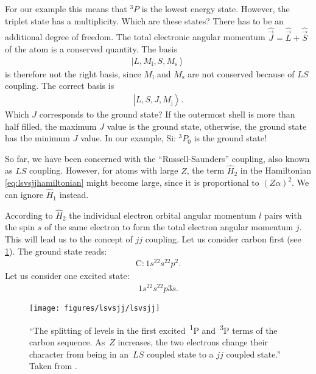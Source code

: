 \documentclass[10pt]{article}
\let\cite\citep
\providecommand\citep{\cite}
\newcommand{\ket}[1]{\ensuremath{\left|#1\right\rangle}}
\newcommand*\ch[1]{\ensuremath{\mathrm{#1}}}
\begin{document}
For our example this means that $^3P$ is the lowest energy state. However, the triplet state has a multiplicity.  Which are these states? There has to be an additional degree of freedom. The total electronic angular momentum $\hat{\vec{J}} = \hat{\vec{L}} + \hat{\vec{S}}$ of the atom is a conserved quantity. The basis
\begin{align}
\ket{L,M_\textrm{l},S,M_\textrm{s}}
\end{align}
is therefore not the right basis, since $M_\textrm{l}$ and $M_\textrm{s}$ are not conserved because of $LS$ coupling. The correct basis is
\begin{align}
\ket{L,S,J,M_\textrm{j}}.
\end{align}
Which $J$ corresponds to the ground state?
 If the outermost shell is more than half filled, the maximum $J$ value is the ground state, otherwise, the ground state has the minimum $J$ value. In our example, \ch{Si}: $^3P_0$ is the ground state!


So far, we have been concerned with the ``Russell-Saunders'' coupling, also known as $LS$ coupling. However, for atoms with large $Z$, the term $\hat{H}_2$ in the Hamiltonian \eqref{eq:lsvsjjhamiltonian}
might become large, since it is proportional to $(Z \alpha)^2$. We can ignore $\hat{H}_1$ instead.

According to $\hat{H}_2$ the individual electron orbital angular momentum $l$ pairs with the spin $s$ of the same electron to form the total electron angular momentum $j$. This will lead us to the concept of $jj$ coupling. Let us consider carbon first (see \ref{693186}). The ground state reads:
\begin{align}
\ch{C}: 1s^22s^22p^2.
\end{align}
Let us consider one excited state:
\begin{align}
1s^22s^22p3s.
\end{align}
\begin{figure}[h!]
\begin{center}
\texttt{[image: figures/lsvsjj/lsvsjj]}
\caption{{``The splitting of levels in the first excited~\textsuperscript{1}P
and~\textsuperscript{3}P terms of the carbon sequence.
As~\(Z\) increases, the two electrons change their
character from being in an~\(LS\) coupled state to a
\(jj\) coupled state.'' Taken from \protect\cite{pearson}.
{\label{693186}}%
}}
\end{center}
\end{figure}
\end{document}
